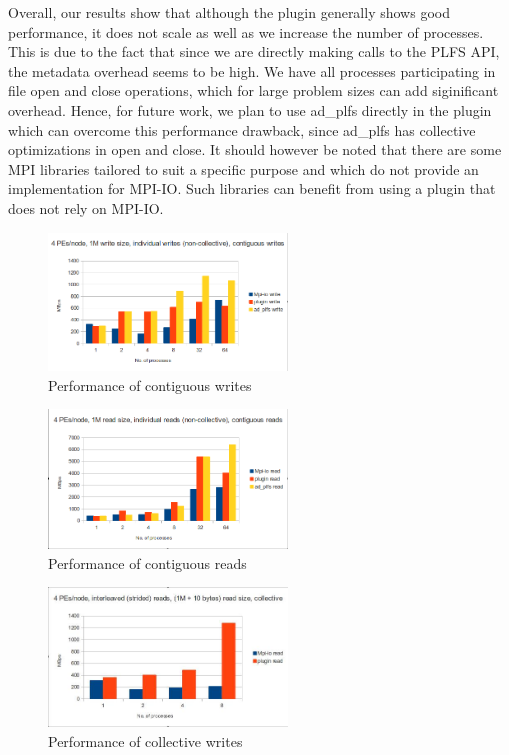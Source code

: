 Overall, our results show that although the plugin generally shows good performance, it does not scale as well as we increase the number of processes. This is due to the fact that since we are directly making calls to the PLFS API, the metadata overhead seems to be high. We have all processes participating in file open and close operations, which for large problem sizes can add siginificant overhead. Hence, for future work, we plan to use ad\_plfs directly in the plugin which can overcome this performance drawback, since ad\_plfs has collective optimizations in open and close. It should however be noted that there are some MPI libraries tailored to suit a specific purpose and which do not provide an implementation for MPI-IO. Such libraries can benefit from using a plugin that does not rely on MPI-IO. 

\begin{figure}[!t]
\centering
\includegraphics[width=2.5in]{4PEs_node_1M_contig_ind_writes}
\caption{Performance of contiguous writes}
\label{write_contig}
\end{figure}

\begin{figure}[!t]
\centering
\includegraphics[width=2.5in]{4pes_node_1m_ind_read}
\caption{Performance of contiguous reads}
\label{read_contig}
\end{figure}


\begin{figure}[!t]
\centering
\includegraphics[width=2.5in]{4pes_interleaved_1m10_coll_reads}
\caption{Performance of collective writes}
\label{write_collective}
\end{figure}


